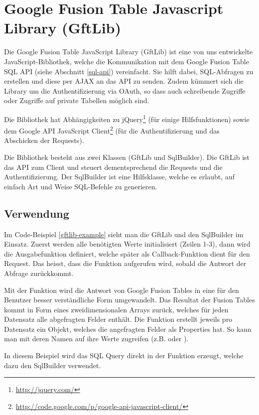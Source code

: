 \section{Google Fusion Table Javascript Library (GftLib)}
\label{gftlib-js}
Die Google Fusion Table JavaScript Library (GftLib) ist eine von uns entwickelte JavaScript-Bibliothek, welche die Kommunikation mit dem Google Fusion Table SQL \gls{API} (siehe Abschnitt \ref{sql-api}) vereinfacht. Sie hilft dabei, SQL-Abfragen zu erstellen und diese per \gls{AJAX} an das \gls{API} zu senden. Zudem kümmert sich die Library um die Authentifizierung via \gls{OAuth}, so dass auch schreibende Zugriffe oder Zugriffe auf private Tabellen möglich sind.

Die Bibliothek hat Abhängigkeiten zu jQuery\footnote{\url{http://jquery.com/}} (für einige Hilfsfunktionen) sowie dem Google \gls{API} JavaScript Client\footnote{\url{http://code.google.com/p/google-api-javascript-client/}} (für die Authentifizierung und das Abschicken der Requests).

Die Bibliothek besteht aus zwei Klassen (GftLib und SqlBuilder). Die GftLib ist das \gls{API} zum Client und steuert dementsprechend die Requests und die Authentifizierung. Der SqlBuilder ist eine Hilfsklasse, welche es erlaubt, auf einfach Art und Weise SQL-Befehle zu generieren.

\subsection{Verwendung}
Im Code-Beispiel \ref{gftlib-example} sieht man die GftLib und den SqlBuilder im Einsatz. Zuerst werden alle benötigten Werte initialisiert (Zeilen 1-3), dann wird die Ausgabefunktion  definiert, welche später als Callback-Funktion dient für den Request. Das heisst, dass die Funktion aufgerufen wird, sobald die Antwort der Abfrage zurückkommt. 

Mit der Funktion  wird die Antwort von Google Fusion Tables in eine für den Benutzer besser verständliche Form umgewandelt. Das Resultat der Fusion Tables kommt in Form eines zweidimensionalen Arrays zurück, welches für jeden Datensatz alle abgefragten Felder enthält. Die Funktion erstellt jeweils pro Datensatz ein Objekt, welches die angefragten Felder als Properties hat. So kann man mit deren Namen auf ihre Werte zugreifen (z.B.  oder ).

In diesem Beispiel wird das SQL Query direkt in der Funktion  erzeugt, welche dazu den SqlBuilder verwendet.

